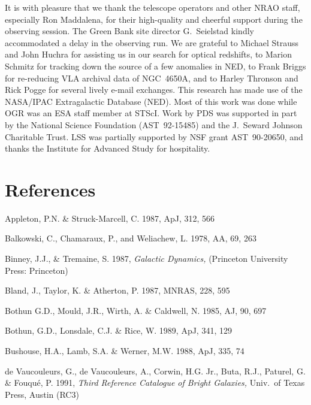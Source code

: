 \vspace*{4.5in}

\medskip

It is with pleasure that we thank the telescope operators and other NRAO staff,
especially Ron Maddalena, for their high-quality and cheerful support during
the observing session.  The Green Bank site director G.~Seielstad kindly
accommodated a delay in the observing run.  
We are grateful to 
Michael Strauss and John Huchra for assisting us in our 
search for optical redshifts, to Marion Schmitz for tracking down the 
source of a few anomalies in NED, to Frank Briggs for re-reducing VLA 
archival data of NGC~4650A, 
and to Harley Thronson and Rick Pogge for several lively e-mail exchanges.     
This research has made use of the NASA/IPAC Extragalactic Database (NED).  
Most of this work was done while OGR was an ESA staff member at STScI.  
Work by PDS was supported in part by the National Science
Foundation (AST~92-15485) and the J.~Seward Johnson Charitable Trust.  
LSS was partially supported by NSF grant AST~90-20650, and thanks the 
Institute for Advanced Study for hospitality.

\vfill\eject

\section*{References}
\renewcommand\bibitem{\par\noindent\hangindent=2pc}

\bibitem  
Appleton, P.N. \& Struck-Marcell, C. 1987, ApJ, 312, 566

\bibitem  %
Balkowski, C., Chamaraux, P., and Weliachew, L. 1978, AA, 69, 263

\bibitem
Binney, J.J., \& Tremaine, S. 1987, {\it Galactic Dynamics,\/}  
(Princeton University Press: Princeton)

\bibitem
Bland, J., Taylor, K. \& Atherton, P. 1987, MNRAS, 228, 595

\bibitem 
Bothun G.D., Mould, J.R., Wirth, A. \& Caldwell, N. 1985, AJ, 90, 697

\bibitem
Bothun, G.D., Lonsdale, C.J. \& Rice, W. 1989, ApJ, 341, 129

\bibitem
Bushouse, H.A., Lamb, S.A. \& Werner, M.W. 1988, ApJ, 335, 74

\bibitem 
de Vaucouleurs, G., de Vaucouleurs, A., Corwin, H.G. Jr., Buta, R.J., 
Paturel, G. \& Fouqu\'e, P. 1991, 
{\it Third Reference Catalogue of Bright Galaxies,\/} Univ.\ of Texas
Press, Austin (RC3) 

